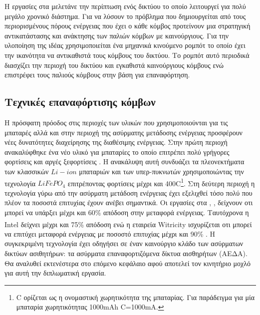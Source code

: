 Η εργασίες στα \cite{sens_deployment1} \cite{sens_deployment2} μελετάνε την περίπτωση ενός δικτύου το οποίο λειτουργεί για πολύ μεγάλο χρονικό διάστημα. Για να
λύσουν το πρόβλημα που δημιουργείται από τους περιορισμένους πόρους ενέργειας που έχει ο κάθε κόμβος προτείνουν μια στρατηγική αντικατάστασης και ανάκτησης των παλιών
κόμβων με καινούργιους. Για την υλοποίηση της ιδέας χρησιμοποιείται ένα μηχανικά κινούμενο ρομπότ το οποίο έχει την ικανότητα να αντικαθιστά τους κόμβους του
δικτύου. Το ρομπότ αυτό περιοδικά διασχίζει την περιοχή του δικτύου και εγκαθιστά καινούργιους κόμβους ενώ επιστρέφει τους παλιούς κόμβους στην βάση για επαναφόρτηση.


\subsection{Τεχνικές επαναφόρτισης κόμβων} \label{sc:recharg_tecnhiques}
Η πρόσφατη πρόοδος στις περιοχές των υλικών που χρησιμοποιούνται για τις μπαταρές αλλά και στην περιοχή της ασύρματης μετάδοσης ενέργειας προσφέρουν νέες δυνατότητες
διαχείρησης της διαθέσιμης ενέργειας. Στην πρώτη περιοχή ανακαλύφθηκε ένα νέο υλικό για μπαταρίες το οποίο επιτρέπει πολύ γρήγορες φορτίσεις και αργές ξεφορτίσεις
\cite{fast_recharging}. Η ανακάλυψη αυτή συνδυάζει τα πλεονεκτήματα των κλασσικών $Li-ion$ μπαταριών και των υπερ-πυκνωτών χρησιμοποιώντας την τεχνολογία
$LiFePO_{4}$ επιτρέποντας φορτίσεις μέχρι και 400C\footnote{C ορίζεται ως η ονομαστική χωρητικότητα της μπαταρίας. Για παράδειγμα για μία
μπαταρία χωρητικότητας 1000mAh C=1000mA.}. Στη δεύτερη περιοχή η τεχνολογία γύρω από την ασύρματη μετάδοση ενέργειας έχει εξελιχθεί τόσο πολύ που πλέον τα ποσοστά
επιτυχίας έχουν ανέβει σημαντικά. Οι εργασίες στα \cite{wireless_recharg1}, \cite{wireless_recharg2}, \cite{wireless_recharg3} δείχνουν οτι μπορεί να υπάρξει μέχρι
και 60\% απόδοση στην μεταφορά ενέργειας. Ταυτόχρονα η Intel\textsuperscript{\textregistered} δείχνει μέχρι και 75\% απόδοση \cite{intel_recharg} ενώ η εταιρεία
Witricity\textsuperscript{\textregistered} ισχυρίζεται οτι μπορεί να επιτύχει μεταφορά ενέργειας με ποσοστό επιτυχίας μέχρι και 90\% \cite{witricity_90}. Η
συγκεκριμένη τεχνολογία έχει οδηγήσει σε έναν καινούργιο κλάδο των ασύρματων δικτύων ασιθητήρων: τα ασύρματα επαναφορτιζόμενα δίκτυα αισθηρήτων (ΑΕΔΑ). Θα αναλυθεί
εκτενέστερα στο επόμενο κεφάλαιο αφού αποτελεί τον κινητήριο μοχλό για αυτή την διπλωματική εργασία.
























